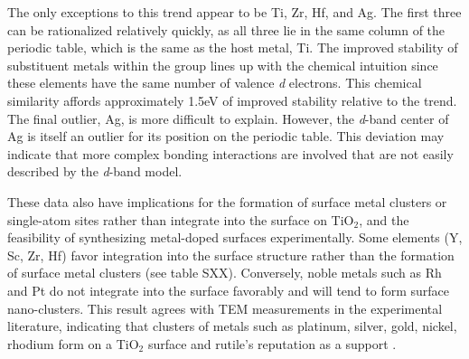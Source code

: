 The only exceptions to this trend appear to be Ti, Zr, Hf, and Ag. The first three can be rationalized relatively quickly, as all three lie in the same column of the periodic table, which is the same as the host metal, Ti. The improved stability of substituent metals within the group lines up with the chemical intuition since these elements have the same number of valence \textit{d} electrons. This chemical similarity affords approximately 1.5eV of improved stability relative to the trend. The final outlier, Ag, is more difficult to explain. However, the \textit{d}-band center of Ag is itself an outlier for its position on the periodic table. This deviation may indicate that more complex bonding interactions are involved that are not easily described by the \textit{d}-band model.


These data also have implications for the formation of surface metal clusters or single-atom sites rather than integrate into the surface on TiO$_2$, and the feasibility of synthesizing metal-doped surfaces experimentally. Some elements (Y, Sc, Zr, Hf) favor integration into the surface structure rather than the formation of surface metal clusters (see table SXX). Conversely, noble metals such as Rh and Pt do not integrate into the surface favorably and will tend to form surface nano-clusters. This result agrees with TEM measurements in the experimental literature, indicating that clusters of metals such as platinum, silver, gold, nickel, rhodium form on a TiO$_2$ surface \cite{Iliev_2006, Dung_Dang_2010, Shinde_2013, Yu_2019} and rutile's reputation as a support \cite{Bagheri_2014}.

